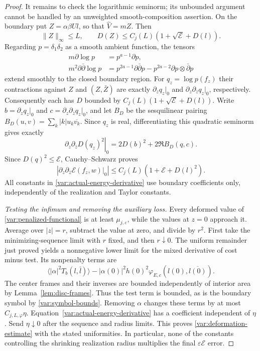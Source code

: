 \documentclass[11pt]{article}
\theoremstyle{definition}
\theoremstyle{remark}
\newcommand{\dd}{\partial\bar\partial}
\newcommand{\eps}{\varepsilon}
\numberwithin{equation}{section}
\begin{document}
\begin{proof}
It remains to check the logarithmic seminorm; its unbounded argument
cannot be handled by an unweighted smooth-composition assertion.
On the boundary put $Z=\alpha\beta Ul$, so that $\widehat V=mZ$.
Then
\[
 \|Z\|_\infty\le L,\qquad
 D(Z)\le C_j(L)(1+\sqrt{\mathcal E}+D(l)).
\]
Regarding $p=\delta_1\delta_2$ as a smooth ambient function, the tensors
\begin{equation}
 \begin{split}
 m\partial\log p&=p^{a-1}\partial p,\\
 m^2\dd\log p&=p^{2a-1}\dd p
                  -p^{2a-2}\partial p\otimes\bar\partial p
 \end{split}
 \label{var:cleared-log-tensors}
\end{equation}
extend smoothly to the closed boundary region.
For $q_z=\log p(f_z)$ their contractions against $Z$ and
$(Z,\bar Z)$ are exactly $\partial_zq_z|_0$ and
$\partial_z\partial_{\bar z}q_z|_0$, respectively.  Consequently each
has $D$ bounded by $C_j(L)(1+\sqrt{\mathcal E}+D(l))$.
Write $b=\partial_zq_z|_0$ and $c=\partial_z\partial_{\bar z}q_z|_0$,
and let $B_D$ be the sesquilinear pairing
$B_D(u,v)=\sum_k|k|u_k\overline{v_k}$.  Since $q_z$ is real,
differentiating this quadratic seminorm gives exactly
\begin{equation}
 \left.\partial_z\partial_{\bar z}D(q_z)^2\right|_0
       =2D(b)^2+2\Re B_D(q,c).
 \label{var:log-energy-identity}
\end{equation}
Since $D(q)^2\le\mathcal E$, Cauchy--Schwarz proves
\begin{equation}
 \left|\left.\partial_z\partial_{\bar z}
                 \mathcal E(f_z,w)\right|_0\right|
 \le C_j(L)(1+\mathcal E+D(l)^2).
 \label{var:actual-energy-derivative}
\end{equation}
All constants in \eqref{var:actual-energy-derivative} use boundary
coefficients only, independently of the realization and Taylor constants.

\emph{Testing the infimum and removing the auxiliary loss.}
Every deformed value of \eqref{var:penalized-functional} is at least
$\mu_{j,\eps}$, while the values at $z=0$ approach it.  Average over
$|z|=r$, subtract the value at zero, and divide by $r^2$.
First take the minimizing-sequence limit with $r$ fixed, and then
$r\downarrow0$.  The uniform remainder just proved yields a
nonnegative lower limit for the mixed derivative of cost minus test.
Its nonpenalty terms are
\[
 \langle|\alpha|^2 T_b(l,\bar l)\rangle
 -|\alpha(0)|^2h(0)^2\varphi_{E,c}(l(0),\overline{l(0)}).
\]
The center frames and their inverses are bounded independently of
interior area by Lemma~\ref{lem:disc-frames}.  Thus the test term is
bounded, as is the boundary symbol by \eqref{var:symbol-bounds}.
Removing $\alpha$ changes these terms by at most $C_{j,L,\varphi}\eta$.
Equation~\eqref{var:actual-energy-derivative} has a coefficient
independent of $\eta$.  Send $\eta\downarrow0$ after the sequence and
radius limits.  This proves \eqref{var:deformation-estimate} with the
stated uniformities.  In particular, none of the constants controlling
the shrinking realization radius multiplies the final $\eps\mathcal E$
error.
\end{proof}
\end{document}
